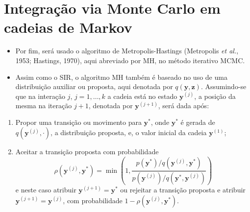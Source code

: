 \documentclass[9pt]{beamer}
\begin{document}
\section{Integração via Monte Carlo em cadeias de Markov}
\begin{frame}
\begin{itemize}
\justifying	
\item Por fim, será usado o algoritmo de Metropolis-Hastings (Metropolis \textit{et al.}, 1953; Hastings, 1970), aqui abreviado por MH, no método iterativo MCMC.
\item Assim como o SIR, o algoritmo MH também é baseado no uso de uma distribuição auxiliar ou proposta, aqui denotada por $q(\bm{y}, \bm{z})$. Assumindo-se que na interação $j$, $j = 1, \ldots, k$ a cadeia está no estado $\bm{y}^{(j)}$, a posição da mesma na iteração $j + 1$, denotada por $\bm{y}^{(j + 1)}$, será dada após:
\end{itemize}
\begin{enumerate}
\justifying
\item Propor uma transição ou movimento para $\bm{y}^*$, onde $\bm{y}^*$ é gerada de $q(\bm{y}^{(j)}, \cdot)$, a distribuição proposta, e, o valor inicial da cadeia $\mathbf{y}^{(1)}$;
\item Aceitar a transição proposta com probabilidade
\begin{equation}\label{eq:mh_tranprob}
\rho(\bm{y}^{(j)}, \bm{y}^*) = \min\left(1, \dfrac{p(\bm{y}^*) / q(\bm{y}^{(j)}, \bm{y}^*)}{p(\bm{y}^{(j)}) / q(\bm{y}^*, \bm{y}^{(j)})}\right)
\end{equation}
e neste caso atribuir $\bm{y}^{(j + 1)} = \bm{y}^*$ ou rejeitar a transição proposta e atribuir $\bm{y}^{(j + 1)} = \bm{y}^{(j)}$, com probabilidade $1 - \rho(\bm{y}^{(j)}, \bm{y}^*)$.
\end{enumerate}
\end{frame}
\end{document}
